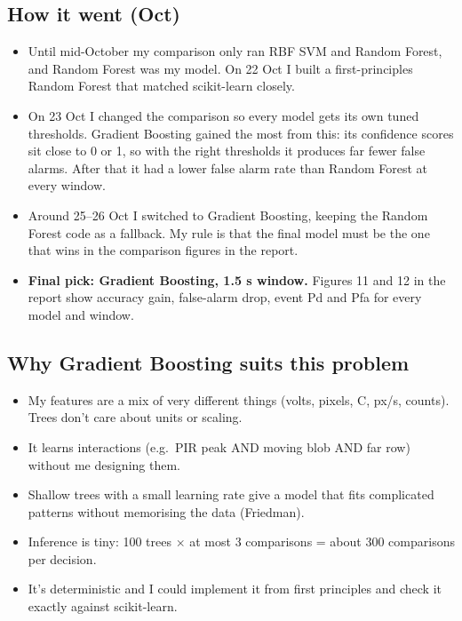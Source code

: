 \documentclass[11pt,a4paper]{article}
\providecommand{\tightlist}{\setlength{\itemsep}{0pt}\setlength{\parskip}{0pt}}
\begin{document}
\hypertarget{how-it-went-oct}{%
\subsection{How it went
(Oct)}\label{how-it-went-oct}}

\begin{itemize}
\tightlist
\item
  Until mid-October my
  comparison only ran RBF SVM
  and Random Forest, and
  Random Forest was my model.
  On 22 Oct I built a
  first-principles Random
  Forest that matched
  scikit-learn closely.
\item
  On 23 Oct I changed the
  comparison so every model
  gets its own tuned
  thresholds. Gradient
  Boosting gained the most
  from this: its confidence
  scores sit close to 0 or 1,
  so with the right thresholds
  it produces far fewer false
  alarms. After that it had a
  lower false alarm rate than
  Random Forest at every
  window.
\item
  Around 25--26 Oct I switched
  to Gradient Boosting,
  keeping the Random Forest
  code as a fallback. My rule
  is that the final model must
  be the one that wins in the
  comparison figures in the
  report.
\item
  \textbf{Final pick: Gradient
  Boosting, 1.5 s window.}
  Figures 11 and 12 in the
  report show accuracy gain,
  false-alarm drop, event Pd
  and Pfa for every model and
  window.
\end{itemize}

\hypertarget{why-gradient-boosting-suits-this-problem}{%
\subsection{Why Gradient
Boosting suits this
problem}\label{why-gradient-boosting-suits-this-problem}}

\begin{itemize}
\tightlist
\item
  My features are a mix of
  very different things
  (volts, pixels, \textdegree{}C, px/s,
  counts). Trees don't care
  about units or scaling.
\item
  It learns interactions
  (e.g.~PIR peak AND moving
  blob AND far row) without me
  designing them.
\item
  Shallow trees with a small
  learning rate give a model
  that fits complicated
  patterns without memorising
  the data (Friedman).
\item
  Inference is tiny: 100 trees
  $\times$ at most 3 comparisons =
  about 300 comparisons per
  decision.
\item
  It's deterministic and I
  could implement it from
  first principles and check
  it exactly against
  scikit-learn.
\end{itemize}
\end{document}
